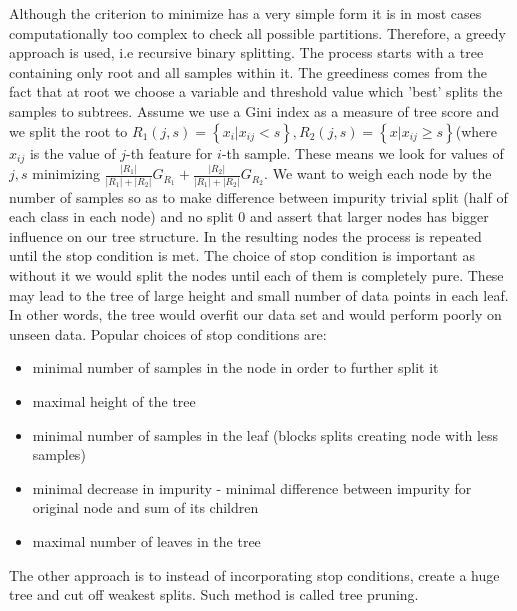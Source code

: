 \documentclass[12pt, wide]{mwart}
\begin{document}
Although the criterion to minimize has a very simple form it is in most cases computationally too complex to check all possible partitions. Therefore, a greedy approach is used, i.e recursive binary splitting. The process starts with a tree containing only root and all samples within it. The greediness comes from the fact that at root we choose a variable and threshold value which 'best' splits the samples to subtrees. Assume we use a Gini index as a measure of tree score and we split the root to $R_1(j, s) = \left\{x_i| x_{ij} < s \right\}, R_2(j, s) = \left\{x| x_{ij} \geq s \right\}$(where $x_{ij}$ is the value of $j$-th feature for $i$-th sample. These means we look for values of $j,s$ minimizing $\frac{|R_1|}{|R_1|+|R_2|}G_{R_1} + \frac{|R_2|}{|R_1|+|R_2|}G_{R_2}$. We want to weigh each node by the number of samples so as to make difference between impurity trivial split (half of each class in each node) and no split $0$ and assert that larger nodes has bigger influence on our tree structure. In the resulting nodes the process is repeated until the stop condition is met. The choice of stop condition is important as without it we would split the nodes until each of them is completely pure. These may lead to the tree of large height and small number of data points in each leaf. In other words, the tree would overfit our data set and would perform poorly on unseen data. Popular choices of stop conditions are:
\begin{itemize}
    \item minimal number of samples in the node in order to further split it
    \item maximal height of the tree
    \item minimal number of samples in the leaf (blocks splits creating node with less samples)
    \item minimal decrease in impurity - minimal difference between impurity for original node and sum of its children
    \item maximal number of leaves in the tree
\end{itemize}

The other approach is to instead of incorporating stop conditions, create a huge tree and cut off weakest splits. Such method is called tree pruning. 
\end{document}
